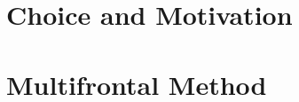






\section{Choice and Motivation}
\label{subseq:choice and motivation}



\section{Multifrontal Method}
\label{subseq:multifrontal method}

